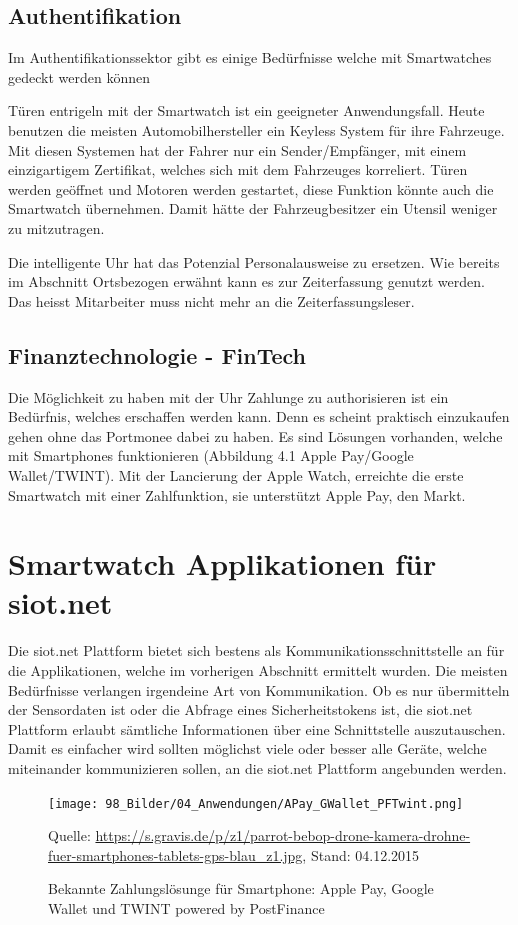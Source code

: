 \subsection{Authentifikation}
Im Authentifikationssektor gibt es einige Bedürfnisse welche mit Smartwatches gedeckt werden können

Türen entrigeln mit der Smartwatch ist ein geeigneter Anwendungsfall. Heute benutzen die meisten Automobilhersteller ein Keyless System für ihre Fahrzeuge. Mit diesen Systemen hat der Fahrer nur ein Sender/Empfänger, mit einem einzigartigem Zertifikat, welches sich mit dem Fahrzeuges korreliert. Türen werden geöffnet und Motoren werden gestartet, diese Funktion könnte auch die Smartwatch übernehmen. Damit hätte der Fahrzeugbesitzer ein Utensil weniger zu mitzutragen.

Die intelligente Uhr hat das Potenzial Personalausweise zu ersetzen. Wie bereits im Abschnitt Ortsbezogen erwähnt kann es zur Zeiterfassung genutzt werden. Das heisst Mitarbeiter muss nicht mehr an die Zeiterfassungsleser.

\subsection{Finanztechnologie - FinTech}
Die Möglichkeit zu haben mit der Uhr Zahlunge zu authorisieren ist ein Bedürfnis, welches erschaffen werden kann. Denn es scheint praktisch einzukaufen gehen ohne das Portmonee dabei zu haben. Es sind Lösungen vorhanden, welche mit Smartphones funktionieren {(Abbildung 4.1 Apple Pay/Google Wallet/TWINT)}. Mit der Lancierung der Apple Watch, erreichte die erste Smartwatch mit einer Zahlfunktion, sie unterstützt Apple Pay, den Markt.

\section{Smartwatch Applikationen für siot.net}
Die siot.net Plattform bietet sich bestens als Kommunikationsschnittstelle an für die Applikationen, welche im vorherigen Abschnitt ermittelt wurden. Die meisten Bedürfnisse verlangen irgendeine Art von Kommunikation. Ob es nur übermitteln der Sensordaten ist oder die Abfrage eines Sicherheitstokens ist, die siot.net Plattform erlaubt sämtliche Informationen über eine Schnittstelle auszutauschen. Damit es einfacher wird sollten möglichst viele oder besser alle Geräte, welche miteinander kommunizieren sollen, an die siot.net Plattform angebunden werden.
\begin{figure}[h]
  \centering
  \texttt{[image: 98\_Bilder/04\_Anwendungen/APay\_GWallet\_PFTwint.png]}
  \caption[Mobile Zahlungslösungen: Apple Pay, Google Wallet und TWINT powered by PostFinance]{Bekannte Zahlungslösunge für Smartphone: Apple Pay, Google Wallet und TWINT powered by PostFinance}
  \footnotesize Quelle: \url{https://s.gravis.de/p/z1/parrot-bebop-drone-kamera-drohne-fuer-smartphones-tablets-gps-blau_z1.jpg}, Stand: 04.12.2015
\end{figure}


